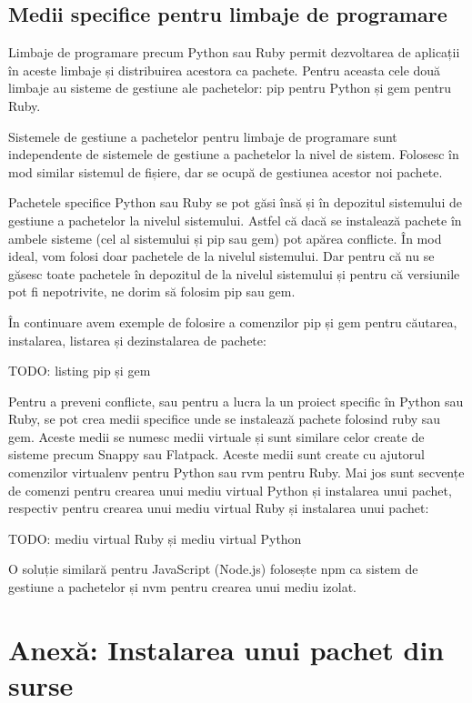\subsection{Medii specifice pentru limbaje de programare}
\label{sec:package:specific}

Limbaje de programare precum Python sau Ruby permit dezvoltarea de aplicații în aceste limbaje și distribuirea acestora ca pachete. Pentru aceasta cele două limbaje au sisteme de gestiune ale pachetelor: pip pentru Python și gem pentru Ruby.

Sistemele de gestiune a pachetelor pentru limbaje de programare sunt independente de sistemele de gestiune a pachetelor la nivel de sistem. Folosesc în mod similar sistemul de fișiere, dar se ocupă de gestiunea acestor noi pachete.

Pachetele specifice Python sau Ruby se pot găsi însă și în depozitul sistemului de gestiune a pachetelor la nivelul sistemului. Astfel că dacă se instalează pachete în ambele sisteme (cel al sistemului și pip sau gem) pot apărea conflicte. În mod ideal, vom folosi doar pachetele de la nivelul sistemului. Dar pentru că nu se găsesc toate pachetele în depozitul de la nivelul sistemului și pentru că versiunile pot fi nepotrivite, ne dorim să folosim pip sau gem.

În continuare avem exemple de folosire a comenzilor pip și gem pentru căutarea, instalarea, listarea și dezinstalarea de pachete:

TODO: listing pip și gem

Pentru a preveni conflicte, sau pentru a lucra la un proiect specific în Python sau Ruby, se pot crea medii specifice unde se instalează pachete folosind ruby sau gem. Aceste medii se numesc medii virtuale și sunt similare celor create de sisteme precum Snappy sau Flatpack. Aceste medii sunt create cu ajutorul comenzilor virtualenv pentru Python sau rvm pentru Ruby. Mai jos sunt secvențe de comenzi pentru crearea unui mediu virtual Python și instalarea unui pachet, respectiv pentru crearea unui mediu virtual Ruby și instalarea unui pachet:

TODO: mediu virtual Ruby și mediu virtual Python

O soluție similară pentru JavaScript (Node.js) folosește npm ca sistem de gestiune a pachetelor și nvm pentru crearea unui mediu izolat.

\section{Anexă: Instalarea unui pachet din surse}
\label{sec:package:source}

